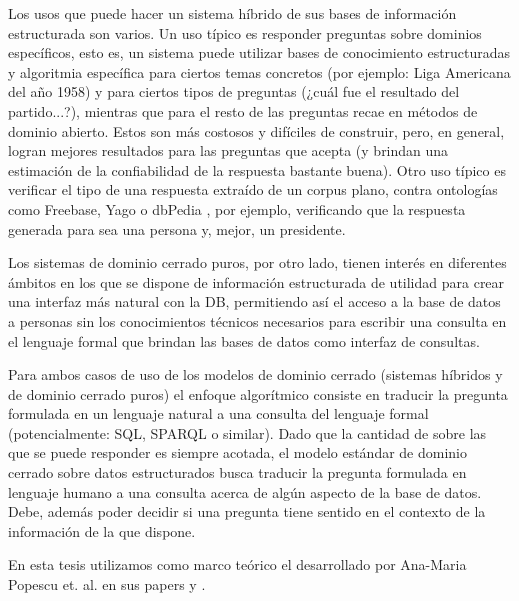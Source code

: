 Los usos que puede hacer un sistema híbrido de sus bases de información estructurada son varios. Un uso típico es responder preguntas sobre dominios específicos, esto es, un sistema puede utilizar bases de conocimiento estructuradas y algoritmia específica para ciertos temas concretos (por ejemplo: Liga Americana del año 1958) y para ciertos tipos de preguntas (¿cuál fue el resultado del partido...?), mientras que para el resto de las preguntas recae en métodos de dominio abierto. Estos  son más costosos y difíciles de construir, pero, en general, logran mejores resultados para las preguntas que acepta (y brindan una estimación de la confiabilidad de la respuesta bastante buena). Otro uso típico es verificar el tipo de una respuesta extraído de un corpus plano, contra ontologías como Freebase, Yago o dbPedia \cite{WATSON2}, por ejemplo, verificando que la respuesta generada para  sea una persona y, mejor, un presidente.

Los sistemas de dominio cerrado puros, por otro lado, tienen interés en diferentes ámbitos en los que se dispone de información estructurada de utilidad para crear una interfaz más natural con la DB, permitiendo así el acceso a la base de datos a personas sin los conocimientos técnicos necesarios para escribir una consulta en el lenguaje formal que brindan las bases de datos como interfaz de consultas.

Para ambos casos de uso de los modelos de dominio cerrado (sistemas híbridos y de dominio cerrado puros) el enfoque algorítmico consiste en traducir la pregunta formulada en un lenguaje natural a una consulta del lenguaje formal (potencialmente: SQL, SPARQL o similar). Dado que la cantidad de  sobre las que se puede responder es siempre acotada, el modelo estándar de dominio cerrado sobre datos estructurados busca traducir la pregunta formulada en lenguaje humano a una consulta acerca de algún aspecto de la base de datos. Debe, además poder decidir si una pregunta tiene sentido en el contexto de la información de la que dispone.


En esta tesis utilizamos como marco teórico el desarrollado por Ana-Maria Popescu et. al. en sus papers \cite{QADB1} y \cite{QADB2}.

